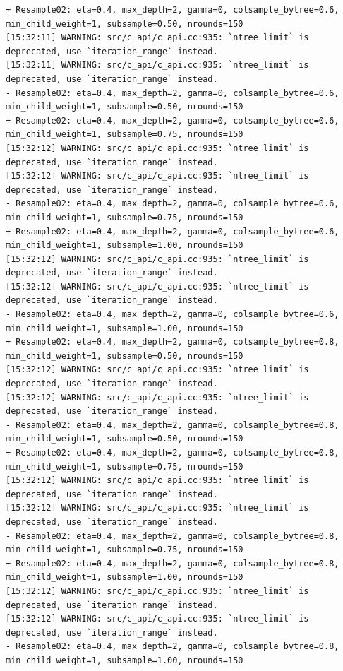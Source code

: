 \documentclass[
  letterpaper,
  DIV=11,
  numbers=noendperiod]{scrartcl}
\begin{document}
\begin{verbatim}
+ Resample02: eta=0.4, max_depth=2, gamma=0, colsample_bytree=0.6, min_child_weight=1, subsample=0.50, nrounds=150 
[15:32:11] WARNING: src/c_api/c_api.cc:935: `ntree_limit` is deprecated, use `iteration_range` instead.
[15:32:11] WARNING: src/c_api/c_api.cc:935: `ntree_limit` is deprecated, use `iteration_range` instead.
- Resample02: eta=0.4, max_depth=2, gamma=0, colsample_bytree=0.6, min_child_weight=1, subsample=0.50, nrounds=150 
+ Resample02: eta=0.4, max_depth=2, gamma=0, colsample_bytree=0.6, min_child_weight=1, subsample=0.75, nrounds=150 
[15:32:12] WARNING: src/c_api/c_api.cc:935: `ntree_limit` is deprecated, use `iteration_range` instead.
[15:32:12] WARNING: src/c_api/c_api.cc:935: `ntree_limit` is deprecated, use `iteration_range` instead.
- Resample02: eta=0.4, max_depth=2, gamma=0, colsample_bytree=0.6, min_child_weight=1, subsample=0.75, nrounds=150 
+ Resample02: eta=0.4, max_depth=2, gamma=0, colsample_bytree=0.6, min_child_weight=1, subsample=1.00, nrounds=150 
[15:32:12] WARNING: src/c_api/c_api.cc:935: `ntree_limit` is deprecated, use `iteration_range` instead.
[15:32:12] WARNING: src/c_api/c_api.cc:935: `ntree_limit` is deprecated, use `iteration_range` instead.
- Resample02: eta=0.4, max_depth=2, gamma=0, colsample_bytree=0.6, min_child_weight=1, subsample=1.00, nrounds=150 
+ Resample02: eta=0.4, max_depth=2, gamma=0, colsample_bytree=0.8, min_child_weight=1, subsample=0.50, nrounds=150 
[15:32:12] WARNING: src/c_api/c_api.cc:935: `ntree_limit` is deprecated, use `iteration_range` instead.
[15:32:12] WARNING: src/c_api/c_api.cc:935: `ntree_limit` is deprecated, use `iteration_range` instead.
- Resample02: eta=0.4, max_depth=2, gamma=0, colsample_bytree=0.8, min_child_weight=1, subsample=0.50, nrounds=150 
+ Resample02: eta=0.4, max_depth=2, gamma=0, colsample_bytree=0.8, min_child_weight=1, subsample=0.75, nrounds=150 
[15:32:12] WARNING: src/c_api/c_api.cc:935: `ntree_limit` is deprecated, use `iteration_range` instead.
[15:32:12] WARNING: src/c_api/c_api.cc:935: `ntree_limit` is deprecated, use `iteration_range` instead.
- Resample02: eta=0.4, max_depth=2, gamma=0, colsample_bytree=0.8, min_child_weight=1, subsample=0.75, nrounds=150 
+ Resample02: eta=0.4, max_depth=2, gamma=0, colsample_bytree=0.8, min_child_weight=1, subsample=1.00, nrounds=150 
[15:32:12] WARNING: src/c_api/c_api.cc:935: `ntree_limit` is deprecated, use `iteration_range` instead.
[15:32:12] WARNING: src/c_api/c_api.cc:935: `ntree_limit` is deprecated, use `iteration_range` instead.
- Resample02: eta=0.4, max_depth=2, gamma=0, colsample_bytree=0.8, min_child_weight=1, subsample=1.00, nrounds=150 

\end{verbatim}
\end{document}
